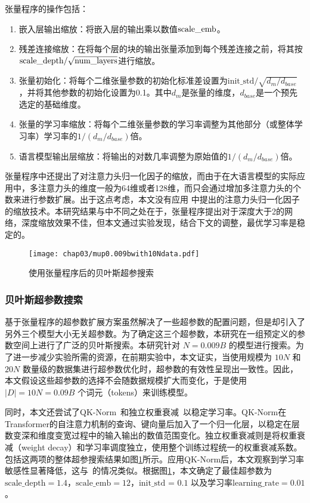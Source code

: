 张量程序的操作包括：
\begin{enumerate}
  \item 嵌入层输出缩放：将嵌入层的输出乘以数值$\text{scale\_\text{emb}}$。
  \item 残差连接缩放：在将每个层的块的输出张量添加到每个残差连接之前，将其按$\text{scale\_\text{depth}}/\sqrt{\text{num\_layers}}$进行缩放。
  \item 张量初始化：将每个二维张量参数的初始化标准差设置为$\text{init\_std}/\sqrt{d_m/d_{base}}$，并将其他参数的初始化设置为0.1。其中$d_m$是张量的维度，$d_{base}$是一个预先选定的基础维度。
  \item 张量的学习率缩放：将每个二维张量参数的学习率调整为其他部分（或整体学习率）学习率的$1/({d_m/d_{base}})$倍。
  \item 语言模型输出层缩放：将输出的对数几率调整为原始值的$1/(d_m/d_{base})$倍。
\end{enumerate}

张量程序中还提出了对注意力头归一化因子的缩放，而由于在大语言模型的实际应用中，多注意力头的维度一般为64维或者128维，而只会通过增加多注意力头的个数来进行参数扩展。出于这点考虑，本文没有应用\citet{yang2022tensor} 中提出的注意力头归一化因子的缩放技术。本研究结果与\citet{yang2023tensor}中不同之处在于，张量程序提出对于深度大于2的网络，深度缩放效果不佳，但本文通过实验发现，结合下文的调整，最优学习率是稳定的。

\begin{figure}[htbp]
  \centering
  \texttt{[image: chap03/mup0.009bwith10Ndata.pdf]}
  \caption{使用张量程序后的贝叶斯超参搜索}
  \label{fig:mupsearch_app}
\end{figure}

\subsubsection{贝叶斯超参数搜索}
基于张量程序的超参数扩展方案虽然解决了一些超参数的配置问题，但是却引入了另外三个模型大小无关超参数。为了确定这三个超参数，本研究在一组预定义的参数空间上进行了广泛的贝叶斯搜索。本研究针对 $N = 0.009B$ 的模型进行搜索。为了进一步减少实验所需的资源，在前期实验中，本文证实，当使用规模为 $10N$ 和 $20N$ 数量级的数据集进行超参数优化时，超参数的有效性呈现出一致性。因此，本文假设这些超参数的选择不会随数据规模扩大而变化，于是使用 $|D| = 10N = 0.09B$ 个词元（tokens）来训练模型。

同时，本文还尝试了QK-Norm~\citep{henry-etal-2020-query}和独立权重衰减~\citep{loshchilov2017decoupled}以稳定学习率。QK-Norm在Transformer的自注意力机制的查询、键向量后加入了一个归一化层，以稳定在层数变深和维度变宽过程中的输入输出的数值范围变化。独立权重衰减则是将权重衰减（weight decay）和学习率调度独立，使用整个训练过程统一的权重衰减系数。包括这两项的整体超参搜索结果如图\ref{fig:mupsearch_app}所示。应用QK-Norm后，本文观察到学习率敏感性显著降低，这与~\citet{wortsman2023small}的情况类似。根据图\ref{fig:mupsearch_app}，本文确定了最佳超参数为 $\text{scale\_depth} = 1.4$，$\text{scale\_emb} = 12$，$\text{init\_std = 0.1}$ 以及学习率$\text{learning\_rate} = 0.01$。



